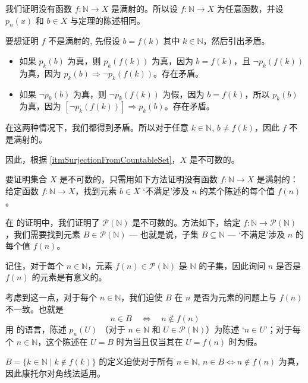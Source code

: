 \begin{cproof}
我们证明没有函数 $f : \mathbb{N} \to X$ 是满射的。所以设 $f : \mathbb{N} \to X$ 为任意函数，并设 $p_n(x)$ 和 $b \in X$ 与定理的陈述相同。

要想证明 $f$ 不是满射的, 先假设 $b=f(k)$ 其中 $k \in \mathbb{N}$，然后引出矛盾。
\begin{itemize}
\item 如果 $p_k(b)$ 为真，则 $p_k(f(k))$ 为真，因为 $b=f(k)$，且 $\neg p_k(f(k))$ 为真，因为 $p_k(b) \Rightarrow \neg p_k(f(k))$。存在矛盾。
\item 如果 $\neg p_k(b)$ 为真，则 $\neg p_k(f(k))$ 为假，因为 $b=f(k)$，所以 $p_k(b)$ 为真，因为 $[\neg p_k(f(k))] \Rightarrow p_k(b)$。存在矛盾。
\end{itemize}
在这两种情况下，我们都得到矛盾。所以对于任意 $k \in \mathbb{N}$, $b \ne f(k)$，因此 $f$ 不是满射的。

因此，根据 \ref{itmSurjectionFromCountableSet}，$X$ 是不可数的。
\end{cproof}

\begin{strategy}[康托尔对角线法]
\label{strCantorDiagonal}
要证明集合 $X$ 是不可数的，只需用如下方法证明没有函数 $f : \mathbb{N} \to X$ 是满射的：给定函数 $f : \mathbb{N} \to X$，找到元素 $b \in X$ `不满足'涉及 $n$ 的某个陈述的每个值 $f(n)$。
\end{strategy}

\begin{example}
在  的证明中，我们证明了 $\mathcal{P}(\mathbb{N})$ 是不可数的。方法如下，给定 $f : \mathbb{N} \to \mathcal{P}(\mathbb{N})$，我们需要找到元素 $B \in \mathcal{P}(\mathbb{N})$ --- 也就是说，子集 $B \subseteq \mathbb{N}$ --- `不满足'涉及 $n$ 的每个值 $f(n)$。

记住，对于每个 $n \in \mathbb{N}$，元素 $f(n) \in \mathcal{P}(\mathbb{N})$ 是 $\mathbb{N}$ 的子集，因此询问 $n$ 是否是 $f(n)$ 的元素是有意义的。

考虑到这一点，对于每个 $n \in \mathbb{N}$，我们迫使 $B$ 在 $n$ 是否为元素的问题上与 $f(n)$ 不一致。也就是
\[ n \in B \quad \Leftrightarrow \quad n \not\in f(n) \]
用  的语言，陈述 $p_n(U)$ （对于 $n \in \mathbb{N}$ 和 $U \in \mathcal{P}(\mathbb{N})$）为陈述 `$n \in U$'；对于每个 $n \in \mathbb{N}$，这个陈述在 $U=B$ 时为当且仅当其在 $U=f(n)$ 时为假。

$B = \{ k \in \mathbb{N} \mid k \not\in f(k) \}$ 的定义迫使对于所有 $n \in \mathbb{N}$, $n \in B \Leftrightarrow n \not\in f(n)$ 为真，因此康托尔对角线法适用。
\end{example}

